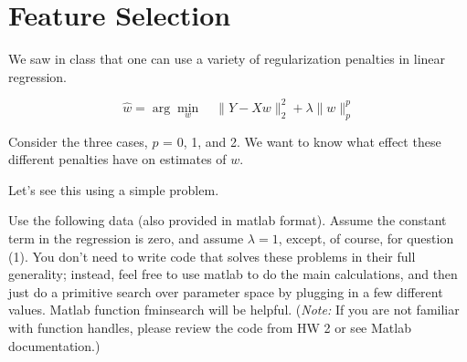 \section{Feature Selection}
We saw in class that one can use a variety of regularization penalties in linear regression.

$$\hat{w} = \arg \min_w  \quad \|Y - Xw\|_2^2 + \lambda \|w\|_p^p$$

Consider the three cases, $p$ = 0, 1, and 2. We want to know what
effect these different penalties have on estimates of $w$.

Let's see this using a simple problem. 

Use the following data (also provided in matlab format).  Assume the
constant term in the regression is zero, and assume $\lambda=1$,
except, of course, for question (1).  You don't need to write code
that solves these problems in their full generality; instead, feel
free to use matlab to do the main calculations, and then just do a
primitive search over parameter space by plugging in a few different
values. Matlab function fminsearch will be helpful. (\emph{Note:} If you are not familiar with function handles, please review the code from HW 2 or see Matlab documentation.)

